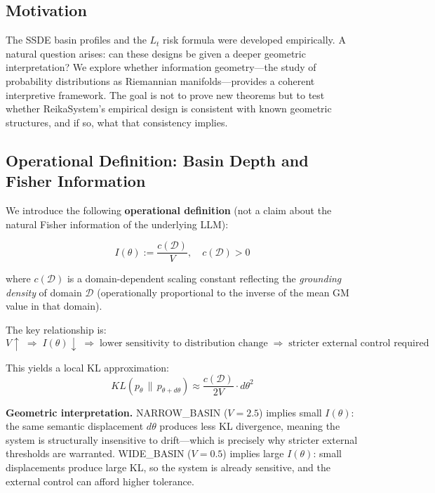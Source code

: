 \documentclass[11pt,a4paper]{article}
\begin{document}
\subsection{Motivation}

The SSDE basin profiles and the $L_t$ risk formula were developed empirically.
A natural question arises: can these designs be given a deeper geometric interpretation?
We explore whether information geometry---the study of probability distributions as
Riemannian manifolds---provides a coherent interpretive framework.
The goal is not to prove new theorems but to test whether ReikaSystem's empirical
design is consistent with known geometric structures, and if so, what that consistency implies.

\subsection{Operational Definition: Basin Depth and Fisher Information}

We introduce the following \textbf{operational definition}
(not a claim about the natural Fisher information of the underlying LLM):

\begin{equation}
I(\theta) := \frac{c(\mathcal{D})}{V}, \quad c(\mathcal{D}) > 0
\label{eq:fisher_def}
\end{equation}

where $c(\mathcal{D})$ is a domain-dependent scaling constant reflecting the
\textit{grounding density} of domain $\mathcal{D}$
(operationally proportional to the inverse of the mean GM value in that domain).

The key relationship is:
\begin{equation}
V \uparrow \;\Rightarrow\; I(\theta) \downarrow \;\Rightarrow\;
\text{lower sensitivity to distribution change}
\;\Rightarrow\; \text{stricter external control required}
\end{equation}

This yields a local KL approximation:
\begin{equation}
KL(p_\theta \,\|\, p_{\theta+d\theta})
\approx \frac{c(\mathcal{D})}{2V} \cdot d\theta^2
\end{equation}

\textbf{Geometric interpretation.}
NARROW\_BASIN ($V=2.5$) implies small $I(\theta)$:
the same semantic displacement $d\theta$ produces less KL divergence,
meaning the system is structurally insensitive to drift---which is precisely why
stricter external thresholds are warranted.
WIDE\_BASIN ($V=0.5$) implies large $I(\theta)$:
small displacements produce large KL, so the system is already sensitive,
and the external control can afford higher tolerance.
\end{document}
